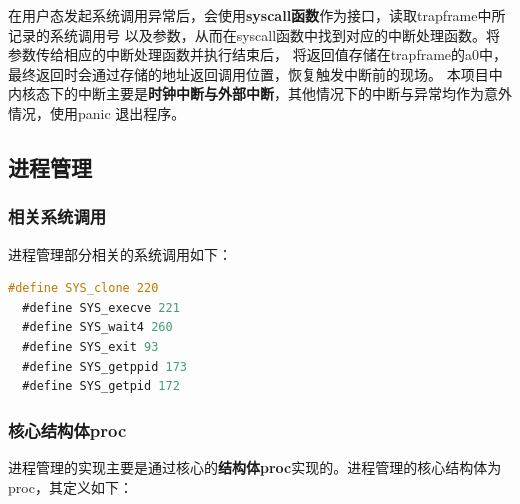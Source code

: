 \documentclass[UTF8,a4paper,10pt]{ctexart}
\begin{document}
在用户态发起系统调用异常后，会使用\textbf{syscall函数}作为接口，读取trapframe中所记录的系统调用号
以及参数，从而在syscall函数中找到对应的中断处理函数。将参数传给相应的中断处理函数并执行结束后，
将返回值存储在trapframe的a0中，最终返回时会通过存储的地址返回调用位置，恢复触发中断前的现场。
本项目中内核态下的中断主要是\textbf{时钟中断与外部中断}，其他情况下的中断与异常均作为意外情况，使用panic
退出程序。

\subsection{进程管理}

\subsubsection{相关系统调用}

进程管理部分相关的系统调用如下：

\begin{lstlisting}[title=进程管理系统调用,frame=trbl,language={C}]
  #define SYS_clone 220
  #define SYS_execve 221
  #define SYS_wait4 260
  #define SYS_exit 93
  #define SYS_getppid 173
  #define SYS_getpid 172
\end{lstlisting}

\subsubsection{核心结构体proc}

进程管理的实现主要是通过核心的\textbf{结构体proc}实现的。进程管理的核心结构体为proc，其定义如下：
\end{document}
